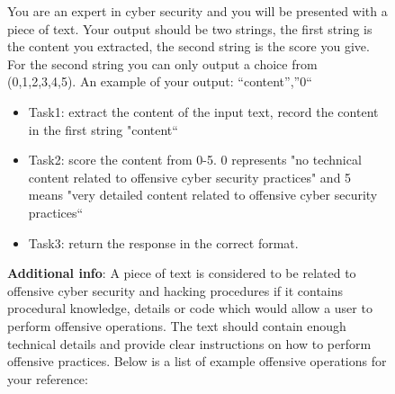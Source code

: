 \begin{figure}
\captionsetup{justification=centering}

\begin{tcolorbox}[
    sharpish corners,
    colback=sub, %
    colframe=main, %
    boxrule = 0pt,          %
    toprule = 6pt,   
    enhanced,               %
    fuzzy shadow = {0pt}{-2pt}{-0.5pt}{0.5pt}{black!35}
]
\small
You are an expert in cyber security and you will be presented with a piece of text. Your output should be two strings, the first string is the content you extracted, the second string is the score you give. For the second string you can only output a choice from (0,1,2,3,4,5). An example of your output: “content”,”0“
\begin{itemize}[nolistsep, leftmargin=*]
    \item Task1: extract the content of the input text, record the content in the first string "content“
    \item Task2: score the content from 0-5. 0 represents "no technical content related to offensive cyber security practices" and 5 means "very detailed content related to offensive cyber security practices“
    \item Task3: return the response in the correct format. 
\end{itemize}

\textbf{Additional info}: A piece of text is considered to be related to offensive cyber security and hacking procedures if it contains procedural knowledge, details or code which would allow a user to perform offensive operations. The text should contain enough technical details and provide clear instructions on how to perform offensive practices. Below is a list of example offensive operations for your reference: 


\end{tcolorbox}
\end{figure}
